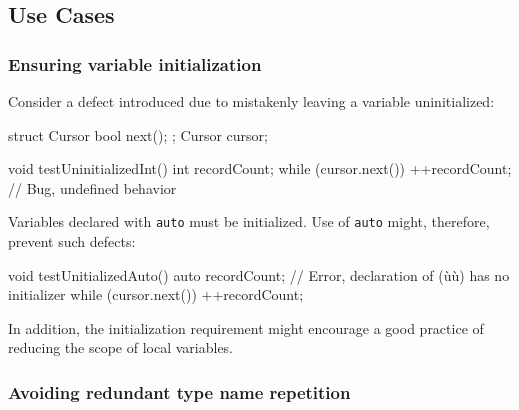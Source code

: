 \subsection[Use Cases]{Use Cases}\label{use-cases-auto}

\subsubsection[Ensuring variable initialization]{Ensuring variable initialization}\label{ensuring-variable-initialization}

Consider a defect introduced due to mistakenly leaving a variable
uninitialized:

\begin{emcppshiddenlisting}[emcppsbatch=e4]
struct Cursor {
    bool next();
};
Cursor cursor;
\end{emcppshiddenlisting}
\begin{emcppslisting}[emcppsbatch=e4]
void testUninitializedInt()
{
    int recordCount;
    while (cursor.next()) { ++recordCount; }  // Bug, undefined behavior
}
\end{emcppslisting}
    
\noindent Variables declared with \lstinline!auto! must be initialized. Use of
\lstinline!auto! might, therefore, prevent such defects:

\begin{emcppslisting}[emcppsbatch=e4,emcppserrorlines={4}]
void testUnitializedAuto()
{
    auto recordCount; // Error, declaration of (ù{}ù) has no initializer
    while (cursor.next()) { ++recordCount; }
}
\end{emcppslisting}
    
\noindent In addition, the initialization requirement might encourage a good
practice of reducing the scope of local variables.

\subsubsection[Avoiding redundant type name repetition]{Avoiding redundant type name repetition}\label{avoiding-redundant-type-name-repetition}


